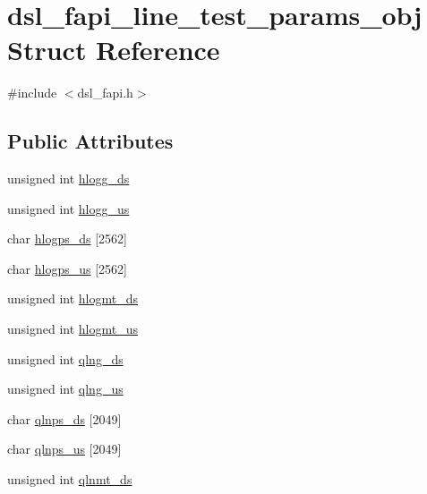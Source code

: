 \hypertarget{structdsl__fapi__line__test__params__obj}{\section{dsl\-\_\-fapi\-\_\-line\-\_\-test\-\_\-params\-\_\-obj Struct Reference}
\label{structdsl__fapi__line__test__params__obj}
}


{\ttfamily \#include $<$dsl\-\_\-fapi.\-h$>$}

\subsection*{Public Attributes}
\begin{DoxyCompactItemize}
\item 
unsigned int \hyperlink{structdsl__fapi__line__test__params__obj_aa26cbe2bda655479cb8e69914432baba}{hlogg\-\_\-ds}
\item 
unsigned int \hyperlink{structdsl__fapi__line__test__params__obj_accedc3faf0cb39a02ecbcb39635b1cf4}{hlogg\-\_\-us}
\item 
char \hyperlink{structdsl__fapi__line__test__params__obj_a5f64a314b926de0db42b37c794f14daf}{hlogps\-\_\-ds} \mbox{[}2562\mbox{]}
\item 
char \hyperlink{structdsl__fapi__line__test__params__obj_a7d6db75c174584b2fdc5ab0e8ee3d499}{hlogps\-\_\-us} \mbox{[}2562\mbox{]}
\item 
unsigned int \hyperlink{structdsl__fapi__line__test__params__obj_af530199f0de8204228c7df7ddd8436f7}{hlogmt\-\_\-ds}
\item 
unsigned int \hyperlink{structdsl__fapi__line__test__params__obj_a55959d1ae7fc886d4d9e282f33f23f09}{hlogmt\-\_\-us}
\item 
unsigned int \hyperlink{structdsl__fapi__line__test__params__obj_a365fb061aee0314c538b0158145bcc46}{qlng\-\_\-ds}
\item 
unsigned int \hyperlink{structdsl__fapi__line__test__params__obj_a308e439c5c561eda195fa95aee84505f}{qlng\-\_\-us}
\item 
char \hyperlink{structdsl__fapi__line__test__params__obj_ae4b24cb005ff35e5a582b46249891085}{qlnps\-\_\-ds} \mbox{[}2049\mbox{]}
\item 
char \hyperlink{structdsl__fapi__line__test__params__obj_a07497d9f33930bf1ab615c4ee4b5ed59}{qlnps\-\_\-us} \mbox{[}2049\mbox{]}
\item 
unsigned int \hyperlink{structdsl__fapi__line__test__params__obj_a8c4cb97cde0a44a01190da61bb2191d2}{qlnmt\-\_\-ds}

\end{DoxyCompactItemize}
